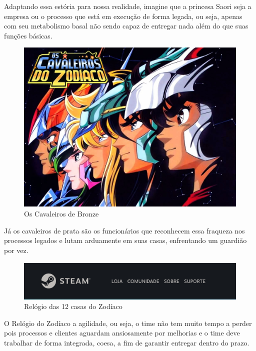 Adaptando essa estória para nossa realidade, imagine que a princesa Saori seja a empresa ou o processo que está em execução de forma legada, ou seja, apenas com seu metabolismo basal não sendo capaz de entregar nada além do que suas funções básicas.

\begin{figure}[H]
    \centering
    \includegraphics[scale=0.33,keepaspectratio=true]{images/09.jpg}
    \caption{Os Cavaleiros de Bronze}
\end{figure}

Já os cavaleiros de prata são os funcionários que reconhecem essa fraqueza nos processos legados e lutam arduamente em suas casas, enfrentando um guardião por vez.

\begin{figure}[H]
    \centering
    \includegraphics[scale=0.35,keepaspectratio=true]{images/07.png}
    \caption{Relógio das 12 casas do Zodíaco}
\end{figure}

O Relógio do Zodíaco a agilidade, ou seja, o time não tem muito tempo a perder pois processos e clientes aguardam ansiosamente por melhorias e o time deve trabalhar de forma integrada, coesa, a fim de garantir entregar dentro do prazo.

